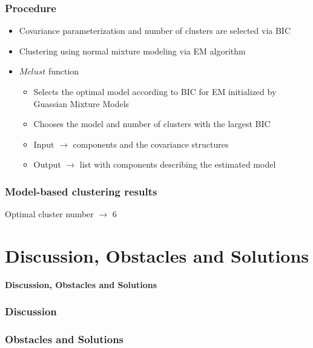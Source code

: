 \documentclass{beamer}
\begin{document}
\begin{frame}
\frametitle{Procedure}
\begin{center}
\begin{itemize}
\item Covariance parameterization and number of clusters are selected via BIC
\item Clustering using normal mixture modeling via EM algorithm
\item $Mclust$ function 
\begin{itemize}
\item Selects the optimal model according to BIC for EM initialized by Guassian Mixture Models
\item Chooses the model and number of clusters with the largest BIC
\item Input $\rightarrow$ components and the covariance structures
\item Output $\rightarrow$ list with components describing the estimated model
\end{itemize}
\end{itemize}
  
\end{center}
\end{frame}



\begin{frame}
\frametitle{Model-based clustering results}
Optimal cluster number $\rightarrow$ 6 \\
\begin{center}
\end{center}
\end{frame}





















\section{Discussion, Obstacles and Solutions}
\begin{frame}
\begin{center}
\textbf{Discussion, Obstacles and Solutions}
\end{center} 
\end{frame}
\begin{frame}
\frametitle{Discussion}


\end{frame}

\begin{frame}
\frametitle{Obstacles and Solutions}

\end{frame}
\end{document}

